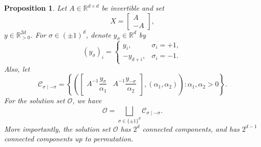 \documentclass{article}
\newtheorem{proposition}{Proposition}[section]
\begin{document}
\begin{proposition}
\label{appxp2:connectedcomponentchar}
Let $A\in\mathbb R^{d\times d}$ be invertible and set
\[
X=\begin{bmatrix}A\\-A\end{bmatrix},
\]
$y\in\mathbb R^{2d}_{>0}$. For
$\sigma\in(\pm1)^d$, denote $y_\sigma\in\mathbb R^d$ by
\[
(y_\sigma)_i
=
\begin{cases}
y_i, & \sigma_i=+1,\\
-y_{d+i}, & \sigma_i=-1.
\end{cases}
\]
Also, let
\[
\mathcal C_{\sigma\mid-\sigma}
=
\left\{
\left(
\begin{bmatrix}
A^{-1}\dfrac{y_\sigma}{\alpha_1}
&
A^{-1}\dfrac{y_{-\sigma}}{\alpha_2}
\end{bmatrix},
(\alpha_1,\alpha_2)
\right)
:\alpha_1,\alpha_2>0
\right\}.
\]
For the solution set $\mathcal{O}$, we have 
\[
\mathcal{O} = \bigsqcup_{\sigma \in \{\pm 1\}^{d}}
\mathcal{C}_{\sigma \mid -\sigma}.
\]
More importantly, the solution set $\mathcal{O}$ has $2^{d}$ connected components, and has $2^{d-1}$ connected components up to permutation.
\end{proposition}
\end{document}

